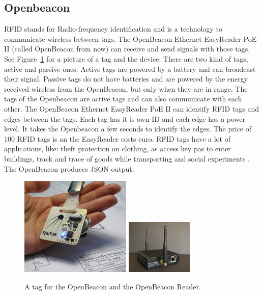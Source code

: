 	\subsection{Openbeacon}
	RFID stands for Radio-frequency identification and is a technology to communicate wireless between tags. The OpenBeacon Ethernet EasyReader PoE II (called OpenBeacon from now) can receive and send signals with those tags. See Figure~\ref{fig:openbeacon} for a picture of a tag and the device. There are two kind of tags, active and passive ones. Active tags are powered by a battery and can broadcast their signal. Passive tags do not have batteries and are powered by the energy received wireless from the OpenBeacon, but only when they are in range. The tags of the Openbeacon are active tags and can also communicate with each other. The OpenBeacon Ethernet EasyReader PoE II can identify RFID tags and edges between the tags. Each tag has it is own ID and each edge has a power level. It takes the Openbeacon a few seconds to identify the edges. The price of 100 RFID tags is  an the EasyReader costs  euro. RFID tags have a lot of applications, like: theft protection on clothing, as access key pas to enter buildings, track and trace of goods while transporting and social experiments \cite{2008arXiv0811.4170B}. The OpenBeacon produces JSON output.


			\begin{figure}[h]
				\label{fig:openbeacon}
				\centering
					\includegraphics[scale=0.5]{tag.jpg}
					\includegraphics[scale=1.0]{reader.jpg}
					
					\caption{A tag for the OpenBeacon \cite{openbeacon} and the OpenBeacon Reader.}

			\end{figure}


